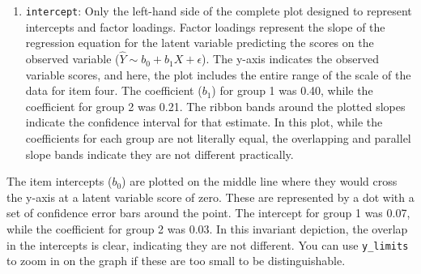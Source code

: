\documentclass[
  man,floatsintext]{apa7}
\providecommand{\tightlist}{%
  \setlength{\itemsep}{0pt}\setlength{\parskip}{0pt}}
\begin{document}
\begin{enumerate}
\def\labelenumi{\arabic{enumi})}
\setcounter{enumi}{1}
\tightlist
\item
  \texttt{intercept}: Only the left-hand side of the complete plot designed to represent intercepts and factor loadings. Factor loadings represent the slope of the regression equation for the latent variable predicting the scores on the observed variable (\(\hat{Y} \sim b_0 + b_1X + \epsilon\)). The y-axis indicates the observed variable scores, and here, the plot includes the entire range of the scale of the data for item four. The coefficient (\(b_1\)) for group 1 was 0.40, while the coefficient for group 2 was 0.21. The ribbon bands around the plotted slopes indicate the confidence interval for that estimate. In this plot, while the coefficients for each group are not literally equal, the overlapping and parallel slope bands indicate they are not different practically.
\end{enumerate}

The item intercepts (\(b_0\)) are plotted on the middle line where they would cross the y-axis at a latent variable score of zero. These are represented by a dot with a set of confidence error bars around the point. The intercept for group 1 was 0.07, while the coefficient for group 2 was 0.03. In this invariant depiction, the overlap in the intercepts is clear, indicating they are not different. You can use \texttt{y\_limits} to zoom in on the graph if these are too small to be distinguishable.
\end{document}

